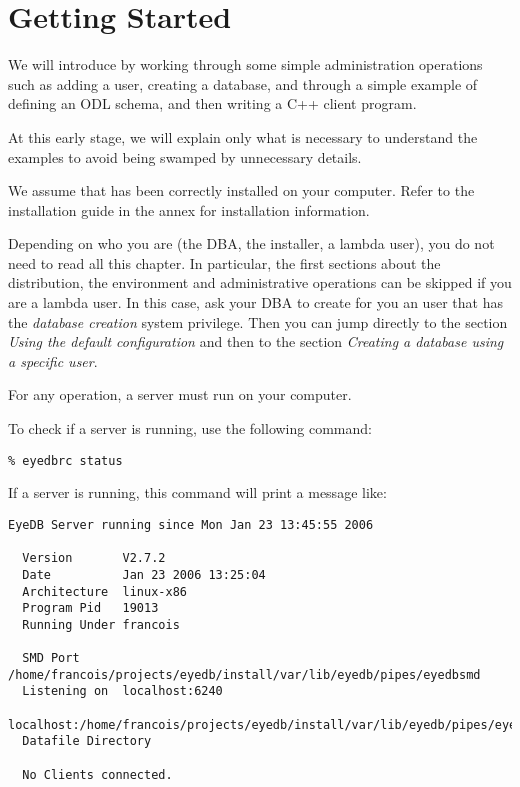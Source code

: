 

\newcommand{\mantitle}{\textsc{Getting Started}}


\tableofcontents

\newcommand{\EYEDBARCH}{\emph{eyedbtop}/\texttt{eyedb-V\eyedbversion}/\emph{archdir}}

\chapter*{Getting Started}



We will introduce \eyedb by working through some simple administration
operations such as adding a user, creating a database, and through
a simple example of defining an ODL schema, and then writing a C++
client program.

At this early stage, we will explain only what is necessary to understand
the examples to avoid being swamped by unnecessary details.

We assume that \eyedb has been correctly installed on your
computer.
Refer to the installation guide in the annex for installation information.

Depending on who you are (the DBA, the installer, a lambda user), you do not need
to read all this chapter. In particular, the first sections about the
distribution, the environment and administrative operations 
can be skipped if you are a lambda user. In this case, ask your DBA to create
for you an \eyedb user that has the \emph{database creation} system privilege. 
Then you can jump directly to the section
\emph{Using the default configuration} and then to the section
\emph{Creating a database using a specific user}.






For any \eyedb operation, a server must run on your computer.

To check if a server is running, use the following command:
\verbsize \begin{verbatim}
% eyedbrc status
\end{verbatim}
\normalsize
If a server is running, this command will print a message like:
\verbsize \begin{verbatim}
EyeDB Server running since Mon Jan 23 13:45:55 2006

  Version       V2.7.2
  Date          Jan 23 2006 13:25:04
  Architecture  linux-x86
  Program Pid   19013
  Running Under francois

  SMD Port      /home/francois/projects/eyedb/install/var/lib/eyedb/pipes/eyedbsmd
  Listening on  localhost:6240
                localhost:/home/francois/projects/eyedb/install/var/lib/eyedb/pipes/eyedbd
  Datafile Directory 

  No Clients connected.
\end{verbatim}
\normalsize

